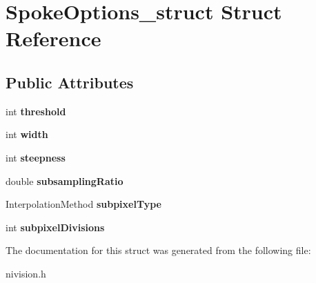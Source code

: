 \hypertarget{structSpokeOptions__struct}{
\section{SpokeOptions\_\-struct Struct Reference}
\label{structSpokeOptions__struct}
}
\subsection*{Public Attributes}
\begin{DoxyCompactItemize}
\item 
\hypertarget{structSpokeOptions__struct_afa43e8d1332461c5c53342bc57f9c538}{
int {\bfseries threshold}}
\label{structSpokeOptions__struct_afa43e8d1332461c5c53342bc57f9c538}

\item 
\hypertarget{structSpokeOptions__struct_a9224feb425787346f3bc215f56c457f1}{
int {\bfseries width}}
\label{structSpokeOptions__struct_a9224feb425787346f3bc215f56c457f1}

\item 
\hypertarget{structSpokeOptions__struct_a23480b55a4e97a800ae0507630a15cb0}{
int {\bfseries steepness}}
\label{structSpokeOptions__struct_a23480b55a4e97a800ae0507630a15cb0}

\item 
\hypertarget{structSpokeOptions__struct_a882945dd8cf0972460f3281868f80ad2}{
double {\bfseries subsamplingRatio}}
\label{structSpokeOptions__struct_a882945dd8cf0972460f3281868f80ad2}

\item 
\hypertarget{structSpokeOptions__struct_ab430f91134183cccb1157a245c1921c0}{
InterpolationMethod {\bfseries subpixelType}}
\label{structSpokeOptions__struct_ab430f91134183cccb1157a245c1921c0}

\item 
\hypertarget{structSpokeOptions__struct_a36e0fd5eee4a0bba2decce39a68d089a}{
int {\bfseries subpixelDivisions}}
\label{structSpokeOptions__struct_a36e0fd5eee4a0bba2decce39a68d089a}

\end{DoxyCompactItemize}


The documentation for this struct was generated from the following file:\begin{DoxyCompactItemize}
\item 
nivision.h\end{DoxyCompactItemize}
